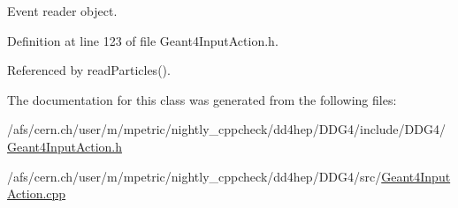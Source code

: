 Event reader object. 



Definition at line 123 of file Geant4\+Input\+Action.\+h.



Referenced by read\+Particles().



The documentation for this class was generated from the following files\+:\begin{DoxyCompactItemize}
\item 
/afs/cern.\+ch/user/m/mpetric/nightly\+\_\+cppcheck/dd4hep/\+D\+D\+G4/include/\+D\+D\+G4/\hyperlink{_geant4_input_action_8h}{Geant4\+Input\+Action.\+h}\item 
/afs/cern.\+ch/user/m/mpetric/nightly\+\_\+cppcheck/dd4hep/\+D\+D\+G4/src/\hyperlink{_geant4_input_action_8cpp}{Geant4\+Input\+Action.\+cpp}\end{DoxyCompactItemize}
